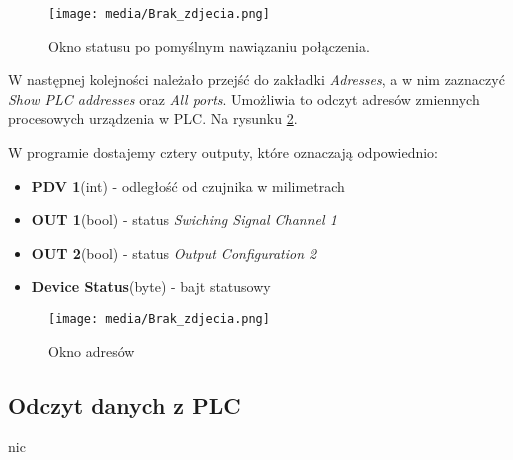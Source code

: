 \documentclass{article}
\begin{document}
\begin{figure}[H]
    \centering
    \texttt{[image: media/Brak\_zdjecia.png]}
    \caption{Okno statusu po pomyślnym nawiązaniu połączenia.}
    \label{fig:status}
\end{figure}

\newpage

W następnej kolejności należało przejść do zakładki \textit{Adresses}, a w nim zaznaczyć \textit{Show PLC addresses} oraz \textit{All ports}.
Umożliwia to odczyt adresów zmiennych procesowych urządzenia w PLC. Na rysunku \ref{fig:adresy}.

W programie dostajemy cztery outputy, które oznaczają odpowiednio: 
\begin{itemize}
    \item \textbf{PDV 1}(int) - odległość od czujnika w milimetrach
    \item \textbf{OUT 1}(bool) - status \textit{Swiching Signal Channel 1}
    \item \textbf{OUT 2}(bool) - status \textit{Output Configuration 2}
    \item \textbf{Device Status}(byte) - bajt statusowy
\end{itemize}


\begin{figure}[H]
    \centering
    \texttt{[image: media/Brak\_zdjecia.png]}
    \caption{Okno adresów}
    \label{fig:adresy}
\end{figure}
\newpage

\subsection{Odczyt danych z PLC}
nic
\end{document}
